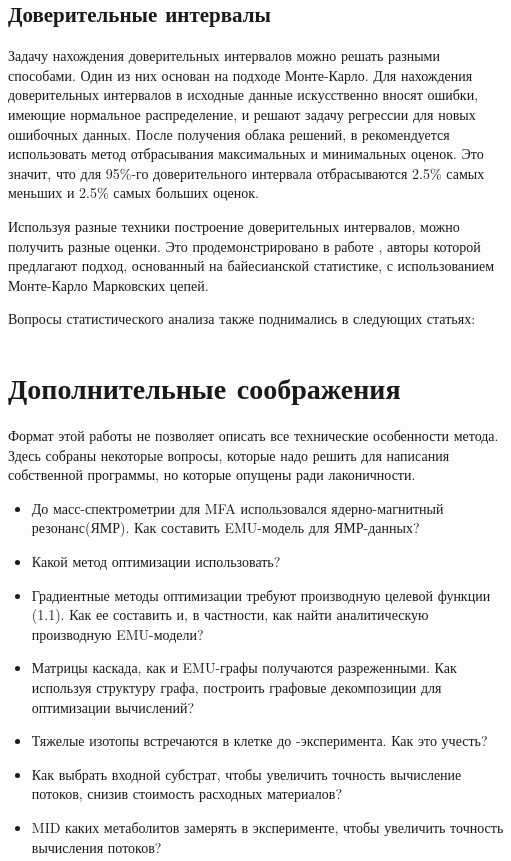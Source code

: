 \documentclass[14pt, a4paper]{extreport}
\begin{document}
\subsection{Доверительные интервалы}
Задачу нахождения доверительных интервалов можно решать разными способами. Один из них основан на подходе Монте-Карло. Для нахождения доверительных интервалов в исходные данные искусственно вносят ошибки, имеющие нормальное распределение, и решают задачу регрессии для новых ошибочных данных. После получения облака решений, в \cite{OpenFlux2} рекомендуется использовать метод отбрасывания максимальных и минимальных оценок. Это значит, что для 95\%-го доверительного интервала отбрасываются 2.5\% самых меньших и 2.5\% самых больших оценок.

Используя разные техники построение доверительных интервалов, можно получить разные оценки. Это продемонстрировано в работе \cite{bayesian}, авторы которой предлагают подход, основанный на байесианской статистике, с использованием Монте-Карло Марковских цепей.

Вопросы статистического анализа также поднимались в следующих статьях: \cite{Wiechert_1999_3, Wiechert_1999_4, ci_antoniewicz, bayesian, bayesian_2, bayesian_3}

\clearpage
\section{Дополнительные соображения}
Формат этой работы не позволяет описать все технические особенности метода. Здесь собраны некоторые вопросы, которые надо решить для написания собственной программы, но которые опущены ради лаконичности.
\begin{itemize}
	\item До масс-спектрометрии для MFA использовался ядерно-магнитный резонанс(ЯМР). Как составить EMU-модель для ЯМР-данных?\cite{EMU_2007}
	\item Какой метод оптимизации использовать?\cite{adjoint_approach, protocol, optimization_in_mfa} \cite[препринт]{2019_gradient}
	\item Градиентные методы оптимизации требуют производную целевой функции (1.1). Как ее составить и, в частности, как найти аналитическую производную EMU-модели? \cite{EMU_2007, protocol}
	\item Матрицы каскада, как и EMU-графы получаются разреженными. Как используя структуру графа, построить графовые декомпозиции для оптимизации вычислений? \cite{topology, emu_topology}
	\item Тяжелые изотопы встречаются в клетке до -эксперимента. Как это учесть?
	\item Как выбрать входной субстрат, чтобы увеличить точность вычисление потоков, снизив стоимость расходных материалов? \cite{planning_optimal, planning_optimal_2, planning_optimal_3, planning_optimal_4} 
	\item MID каких метаболитов замерять в эксперименте, чтобы увеличить точность вычисления потоков? \cite{optimal_measurements}
\end{itemize}
\end{document}
